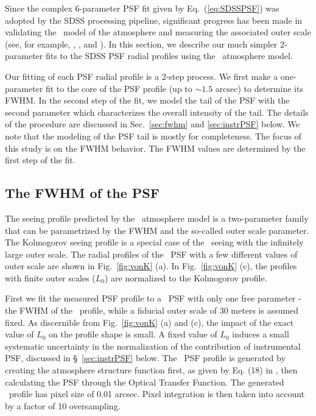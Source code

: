 

Since the complex 6-parameter PSF fit given by Eq.~(\ref{eq:SDSSPSF}) was adopted by 
the SDSS processing pipeline, significant progress has been made in validating the 
\vk~model of the atmosphere and measuring the associated outer
scale (see, for example, \citealt{Tokovinin2002}, \citealt{Boccas2004}, and \citealt{MartinezMessenger}).
In this section, we describe our much simpler 2-parameter fits to the SDSS PSF
radial profiles using the \vk~atmosphere model.

Our fitting of each PSF radial profile is a 2-step process. We first
make a one-parameter fit to the core of the PSF profile (up to $\sim
1.5$ arcsec) to determine its FWHM.
In the second step of the fit, we model the tail of the PSF with the
second parameter which characterizes the overall intensity of the
tail.
The details of the procedure are discussed in Sec.~\ref{sec:fwhm} and
\ref{sec:instrPSF} below.
We note that the modeling of the PSF tail is mostly for completeness.
The focus of this study is on the FWHM behavior. The FWHM values are
determined by the first step of the fit.

\subsection{The FWHM of the PSF \label{sec:fwhm}}

The seeing profile predicted by the \vk~atmosphere model is a two-parameter
family that can be parametrized by the FWHM and the so-called outer scale
parameter. The Kolmogorov seeing profile is a special case of the 
\vk~seeing with the infinitely large outer scale. The radial profiles of the 
\vk~PSF with a few different values of outer scale are shown in Fig.~\ref{fig:vonK} (a). 
In Fig.~\ref{fig:vonK} (c), the profiles with finite outer scales
($L_0$) are normalized to the Kolmogorov profile.

First we fit the
measured PSF profile to a \vk~PSF with only one free parameter -
the FWHM of the \vk~profile, while a fiducial outer scale of 30 meters
is assumed fixed. As discernible from Fig.~\ref{fig:vonK} (a) and (c), the impact of the exact
value of $L_0$ on the profile shape is small. A fixed value of $L_0$ induces a small 
systematic uncertainty in the normalization of the contribution of instrumental PSF, 
discussed in \S~\ref{sec:instrPSF}  below. The \vk~PSF profile is generated by creating 
the atmosphere structure function first, as given by Eq. (18) in \cite{Tokovinin2002},
then calculating the PSF through the Optical Transfer Function. 
The generated \vk~profile has pixel size of 0.01 arcsec.
Pixel integration is then taken into account by a factor of 10 oversampling.

